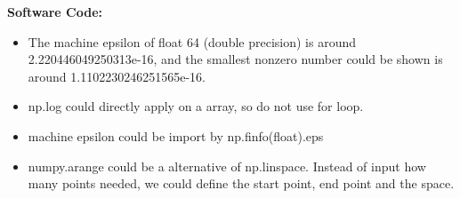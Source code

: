 \documentclass{article}
\begin{document}
\textbf{Software Code:}
\begin{itemize}
\item The machine epsilon of float 64 (double precision) is around 2.220446049250313e-16, and the smallest nonzero number could be shown is around 1.1102230246251565e-16.
\item np.log could directly apply on a array, so do not use for loop.
\item machine epsilon could be import by np.finfo(float).eps
\item numpy.arange could be a alternative of np.linspace. Instead of input how many points needed, we could define the start point, end point and the space.
\end{itemize}
\end{document}
